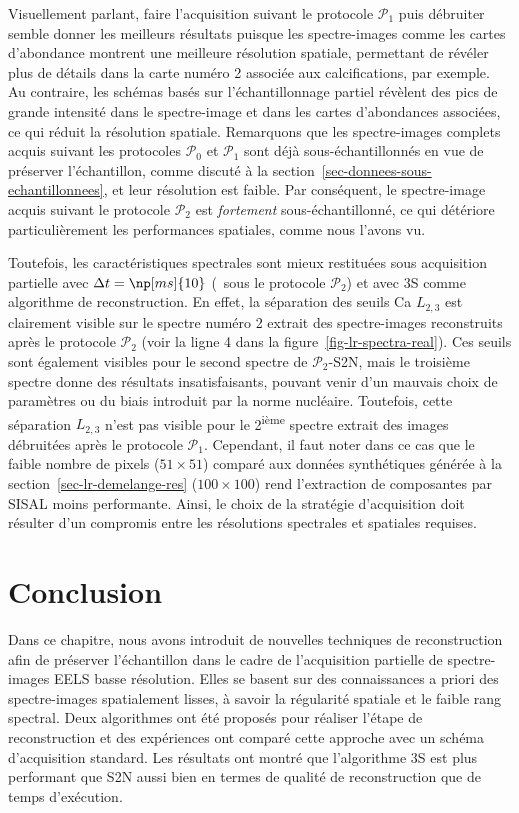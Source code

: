 Visuellement parlant, faire l'acquisition suivant le protocole $\mathcal{P}_1$ puis débruiter semble donner les meilleurs résultats puisque les spectre-images comme les cartes d'abondance montrent une meilleure résolution spatiale, permettant de révéler plus de détails dans la carte numéro 2 associée aux calcifications, par exemple. 
%
Au contraire, les schémas basés sur l'échantillonnage partiel révèlent des pics de grande intensité dans le spectre-image et dans les cartes d'abondances associées, ce qui réduit la résolution spatiale.
%
Remarquons que les spectre-images complets acquis suivant les protocoles $\mathcal{P}_0$ et $\mathcal{P}_1$ sont déjà sous-échantillonnés en vue de préserver l'échantillon, comme discuté à la section~\ref{sec-donnees-sous-echantillonnees}, et leur résolution est faible. Par conséquent, le spectre-image acquis suivant le protocole $\mathcal{P}_2$ est \emph{fortement} sous-échantillonné, ce qui détériore particulièrement les performances spatiales, comme nous l'avons vu.

Toutefois, les caractéristiques spectrales sont mieux restituées sous acquisition partielle avec $\Delta t=\np[ms]{10}$ (\ie\ sous le protocole $\mathcal{P}_2$) et avec 3S comme algorithme de reconstruction. En effet, la séparation des seuils Ca $L_{2, 3}$ est clairement visible sur le spectre numéro 2 extrait des spectre-images reconstruits après le protocole $\mathcal{P}_2$ (voir la ligne 4 dans la figure~\ref{fig-lr-spectra-real}). Ces seuils sont également visibles pour le second spectre de $\mathcal{P}_2$-S2N, mais le troisième spectre donne des résultats insatisfaisants, pouvant venir d'un mauvais choix de paramètres ou du biais introduit par la norme nucléaire. Toutefois, cette séparation $L_{2, 3}$ n'est pas visible pour le 2\textsuperscript{ième} spectre extrait des images débruitées après le protocole $\mathcal{P}_1$. Cependant, il faut noter dans ce cas que le faible nombre de pixels ($51\times 51$) comparé aux données synthétiques générée à la section~\ref{sec-lr-demelange-res} ($100\times 100$) rend l'extraction de composantes par SISAL moins performante. 
%
Ainsi, le choix de la stratégie d'acquisition doit résulter d'un compromis entre les résolutions spectrales et spatiales requises. 
%
 


%
\section{Conclusion}

Dans ce chapitre, nous avons introduit de nouvelles techniques de reconstruction afin de préserver l'échantillon dans le cadre de l'acquisition partielle de spectre-images EELS basse résolution. Elles se basent sur des connaissances a priori des spectre-images spatialement lisses, à savoir la régularité spatiale et le faible rang spectral. 
%
Deux algorithmes ont été proposés pour réaliser l'étape de reconstruction et des expériences ont comparé cette approche avec un schéma d'acquisition standard. Les résultats ont montré que l'algorithme 3S est plus performant que S2N aussi bien en termes de qualité de reconstruction que de temps d'exécution.

